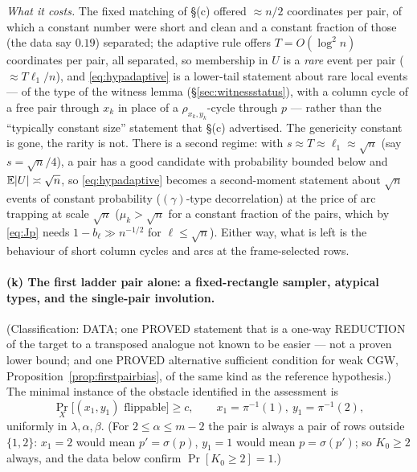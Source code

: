 \emph{What it costs.}  The fixed matching of \S(c) offered $\approx n/2$
coordinates per pair, of which a constant number were short and clean
and a constant fraction of those (the data say $0.19$) separated; the
adaptive rule offers $T=O(\log^2n)$ coordinates per pair, all
separated, so membership in $U$ is a \emph{rare} event per pair
($\approx T\ell_1/n$), and \eqref{eq:hypadaptive} is a lower-tail
statement about rare local events --- of the type of the witness lemma
(\S\ref{sec:witnessstatus}), with a column cycle of a free pair through
$x_k$ in place of a $\rho_{x_k,y_k}$-cycle through $p$ --- rather than
the ``typically constant size'' statement that \S(c) advertised.  The
genericity constant is gone, the rarity is not.  There is a second
regime: with $s\approx T\approx\ell_1\approx\sqrt n$ (say
$s=\sqrt n/4$), a pair has a good candidate with probability bounded
below and $\mathbb{E}|U|\asymp\sqrt n$, so \eqref{eq:hypadaptive} becomes a
second-moment statement about $\sqrt n$ events of constant probability
($(\gamma)$-type decorrelation) at the price of arc trapping at scale
$\sqrt n$ ($\mu_k>\sqrt n$ for a constant fraction of the pairs,
which by \eqref{eq:Jp} needs $1-b_\ell\gg n^{-1/2}$ for
$\ell\le\sqrt n$).  Either way, what is left is the behaviour of
short column cycles and arcs at the frame-selected rows.

\paragraph{(k) The first ladder pair alone: a fixed-rectangle sampler,
atypical types, and the single-pair involution.}  (Classification:
DATA; one PROVED statement that is a one-way REDUCTION of the target
to a transposed analogue not known to be easier --- not a proven lower
bound; and one PROVED alternative sufficient condition for weak CGW,
Proposition~\ref{prop:firstpairbias}, of the same kind as the reference
hypothesis.)
The minimal instance of the obstacle identified in the assessment is
\begin{equation}\label{eq:firstpair}
\Pr_X\bigl[(x_1,y_1)\text{ flippable}\bigr]\ge c,\qquad
x_1=\pi^{-1}(1),\ y_1=\pi^{-1}(2),
\end{equation}
uniformly in $\lambda,\alpha,\beta$.  (For $2\le\alpha\le m-2$ the pair
is always a pair of rows outside $\{1,2\}$: $x_1=2$ would mean
$p'=\sigma(p)$, $y_1=1$ would mean $p=\sigma(p')$; so $K_0\ge2$ always,
and the data below confirm $\Pr[K_0\ge2]=1$.)

